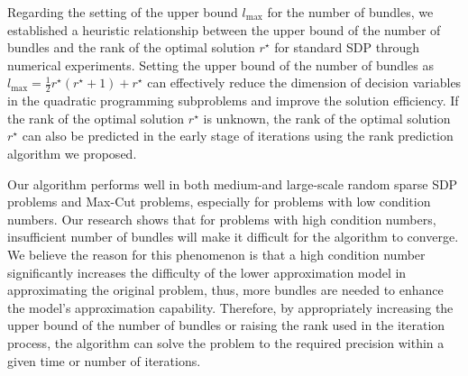 \documentclass{jcmlatex}
\begin{document}
Regarding the setting of the upper bound \( l_{\max} \) for the number of bundles, we established a heuristic relationship between the upper bound of the number of bundles and the rank of the optimal solution \( r^{\star} \) for standard SDP through numerical experiments. Setting the upper bound of the number of bundles as \( l_{\max} = \frac{1}{2}r^{\star}(r^{\star}+1)+r^{\star} \) can effectively reduce the dimension of decision variables in the quadratic programming subproblems and improve the solution efficiency. If the rank of the optimal solution \( r^{\star} \) is unknown, the rank of the optimal solution \( r^{\star} \) can also be predicted in the early stage of iterations using the rank prediction algorithm we proposed.

Our algorithm performs well in both medium-and large-scale random sparse SDP problems and Max-Cut problems, especially for problems with low condition numbers. Our research shows that for problems with high condition numbers, insufficient number of bundles will make it difficult for the algorithm to converge. We believe the reason for this phenomenon is that a high condition number significantly increases the difficulty of the lower approximation model in approximating the original problem, thus, more bundles are needed to enhance the model's approximation capability. Therefore, by appropriately increasing the upper bound of the number of bundles or raising the rank used in the iteration process, the algorithm can solve the problem to the required precision within a given time or number of iterations.
\end{document}
